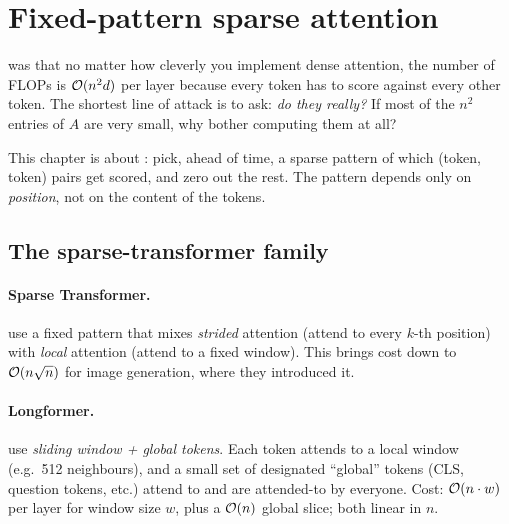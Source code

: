 \section{Fixed-pattern sparse attention}
\label{ch:sparse}

 was that no matter how cleverly you
implement dense attention, the number of FLOPs is \(\mathcal{O}(n^2 d)\) per
layer because every token has to score against every other token. The
shortest line of attack is to ask: \emph{do they really?} If most of the
\(n^2\) entries of \(A\) are very small, why bother computing them at
all?

This chapter is about : pick, ahead
of time, a sparse pattern of which (token, token) pairs get scored, and
zero out the rest. The pattern depends only on \emph{position}, not on the
content of the tokens.

\subsection{The sparse-transformer family}

\paragraph{Sparse Transformer.} \citet{child2019sparse} use a fixed
pattern that mixes \emph{strided} attention (attend to every \(k\)-th
position) with \emph{local} attention (attend to a fixed window). This
brings cost down to \(\mathcal{O}(n \sqrt{n})\) for image generation, where
they introduced it.

\paragraph{Longformer.} \citet{beltagy2020longformer} use \emph{sliding
window + global tokens}. Each token attends to a local window (e.g.\ 512
neighbours), and a small set of designated ``global'' tokens (CLS, question
tokens, etc.) attend to and are attended-to by everyone. Cost: \(\mathcal{O}(n
\cdot w)\) per layer for window size \(w\), plus a \(\mathcal{O}(n)\) global
slice; both linear in \(n\).

